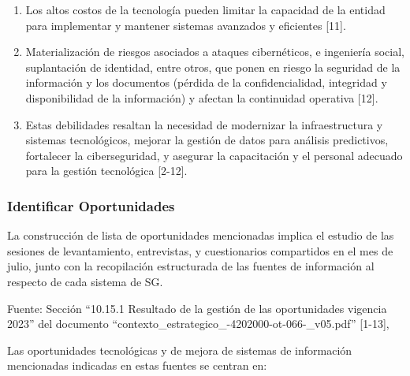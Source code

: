 \documentclass[
	a4paper, %
	12pt, %
]{include/CSSullivanBusinessReport}
\begin{document}
\begin{enumerate}
  Obsolescencia tecnológica que implica la necesidad de renovación de
  los equipos y dificulta la prestación de los servicios de la entidad
  {[}11{]}.
\item
  Los altos costos de la tecnología pueden limitar la capacidad de la
  entidad para implementar y mantener sistemas avanzados y eficientes
  {[}11{]}.
\item
  Materialización de riesgos asociados a ataques cibernéticos, e
  ingeniería social, suplantación de identidad, entre otros, que ponen
  en riesgo la seguridad de la información y los documentos (pérdida de
  la confidencialidad, integridad y disponibilidad de la información) y
  afectan la continuidad operativa {[}12{]}.
\item
  Estas debilidades resaltan la necesidad de modernizar la
  infraestructura y sistemas tecnológicos, mejorar la gestión de datos
  para análisis predictivos, fortalecer la ciberseguridad, y asegurar la
  capacitación y el personal adecuado para la gestión tecnológica
  {[}2-12{]}.
\end{enumerate}

\subsubsection{Identificar
Oportunidades}\label{sec:identificar-oportunidades}

La construcción de lista de oportunidades mencionadas implica el estudio
de las sesiones de levantamiento, entrevistas, y cuestionarios
compartidos en el mes de julio, junto con la recopilación estructurada
de las fuentes de información al respecto de cada sistema de SG.

Fuente: Sección ``10.15.1 Resultado de la gestión de las oportunidades
vigencia 2023'' del documento
``contexto\_estrategico\_-4202000-ot-066-\_v05.pdf'' {[}1-13{]},

Las oportunidades tecnológicas y de mejora de sistemas de información
mencionadas indicadas en estas fuentes se centran en:
\end{document}
